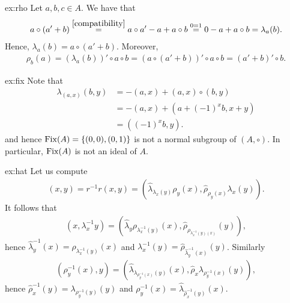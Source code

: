\begin{sol}{ex:rho}
    Let $a,b,c\in A$. We have that
    \begin{align*}
        a\circ(a'+b) \overset{\eqref{compatibility}}{=} a \circ a' - a + a\circ b \overset{0=1}{=} 0 - a + a\circ b = \lambda_a(b).
    \end{align*}
    Hence, $\lambda_a(b)= a\circ(a'+b)$. Moreover,
    \begin{align*}
        \rho_b(a) = (\lambda_a(b))'\circ a \circ b =(a\circ(a'+b))' \circ a \circ b
        = (a'+b)'\circ b.
    \end{align*}
\end{sol}

\begin{sol}{ex:fix}
    Note that  
    \begin{align*}
        \lambda_{(a,x)}(b,y) &= - (a,x) + (a,x)\circ (b,y)\\ &= -(a,x)+(a+(-1)^xb, x+y) \\&=((-1)^xb,y).
    \end{align*}
    and hence $\operatorname{Fix}(A) = \{(0,0),(0,1)\}$ is not a normal subgroup of $(A,\circ)$. 
    In particular, $\operatorname{Fix}(A)$ is not an ideal of $A$.
\end{sol}

\begin{sol}{ex:hat}
    Let us compute
    \begin{align*}
        (x,y)=r^{-1}r(x,y) = (\hat{\lambda}_{\lambda_x(y)}\rho_y(x),\hat{\rho}_{\rho_y(x)}\lambda_x(y)).
    \end{align*}
    It follows that 
    \begin{align*}
        (x,\lambda^{-1}_x{y})=(\hat{\lambda}_y\rho_{\lambda^{-1}_x(y)}(x),\hat{\rho}_{\rho_{\lambda^{-1}_x(y)(x)}}(y)),
    \end{align*}
    hence $\hat{\lambda}^{-1}_y(x)=\rho_{\lambda^{-1}_x(y)}(x)$ and $\lambda^{-1}_x(y)=\hat{\rho}_{\hat{\lambda}^{-1}_y(x)}(y)$. Similarly
    \begin{align*}
        ({\rho^{-1}_y(x)},y)=(\hat{\lambda}_{\lambda_{\rho^{-1}_y(x)}(y)}(x),\hat{\rho}_{x}\lambda_{\rho^{-1}_y(x)}(y)),
    \end{align*}
    hence $\hat{\rho}^{-1}_x(y)=\lambda_{\rho^{-1}_y(y)}(y)$ and $\rho^{-1}_y(x) = \hat{\lambda}_{\hat{\rho}^{-1}_x(y)}(x)$.
\end{sol}